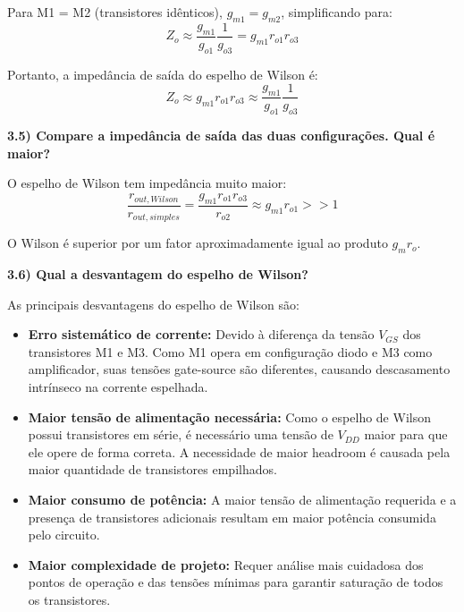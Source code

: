 ﻿\documentclass[12pt,a4paper]{article}
\begin{document}
Para M1 = M2 (transistores idênticos), $g_{m1} = g_{m2}$, simplificando para:
\begin{equation*}
Z_o \approx \frac{g_{m1}}{g_{o1}} \frac{1}{g_{o3}} = g_{m1} r_{o1} r_{o3}
\end{equation*}

Portanto, a impedância de saída do espelho de Wilson é:
\begin{equation}
\boxed{Z_o \approx g_{m1} r_{o1} r_{o3} \approx \frac{g_{m1}}{g_{o1}} \frac{1}{g_{o3}}}
\end{equation}

\textbf{3.5) Compare a impedância de saída das duas configurações. Qual é maior?}

O espelho de Wilson tem impedância muito maior:
\begin{equation*}
\frac{r_{out,Wilson}}{r_{out,simples}} = \frac{g_{m1} r_{o1} r_{o3}}{r_{o2}} \approx g_{m1} r_{o1} >> 1
\end{equation*}

O Wilson é superior por um fator aproximadamente igual ao produto $g_m r_o$.

\textbf{3.6) Qual a desvantagem do espelho de Wilson?}

As principais desvantagens do espelho de Wilson são:

\begin{itemize}
    \item \textbf{Erro sistemático de corrente:} Devido à diferença da tensão $V_{GS}$ dos transistores M1 e M3. Como M1 opera em configuração diodo e M3 como amplificador, suas tensões gate-source são diferentes, causando descasamento intrínseco na corrente espelhada.
    
    \item \textbf{Maior tensão de alimentação necessária:} Como o espelho de Wilson possui transistores em série, é necessário uma tensão de $V_{DD}$ maior para que ele opere de forma correta. A necessidade de maior headroom é causada pela maior quantidade de transistores empilhados.
    
    \item \textbf{Maior consumo de potência:} A maior tensão de alimentação requerida e a presença de transistores adicionais resultam em maior potência consumida pelo circuito.
    
    \item \textbf{Maior complexidade de projeto:} Requer análise mais cuidadosa dos pontos de operação e das tensões mínimas para garantir saturação de todos os transistores.
\end{itemize}
\end{document}
